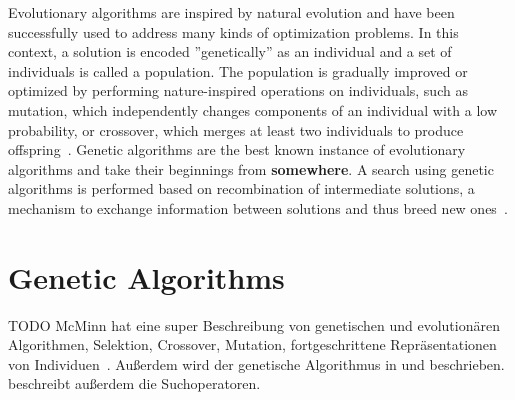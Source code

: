 \documentclass[paper=a4,%
  twoside,%
  BCOR4mm,%
  abstract=true,%
  toc=bibliography,%
  chapterprefix=true,%
  toc=bibliographynumbered,%
  open=right,%
  english,%
  pagesize=pdftex]{scrreprt}
\begin{document}
Evolutionary algorithms are inspired by natural evolution and have been successfully used to address many kinds of optimization problems. In this context, a solution is encoded ''genetically'' as an individual and a set of individuals is called a population. The population is gradually improved or optimized by performing nature-inspired operations on individuals, such as mutation, which independently changes components of an individual with a low probability, or crossover, which merges at least two individuals to produce offspring~\cite{Campos2017a}. Genetic algorithms are the best known instance of evolutionary algorithms and take their beginnings from \textbf{somewhere}. A search using genetic algorithms is performed based on recombination of intermediate solutions, a mechanism to exchange information between solutions and thus breed new ones~\cite{McMinn_2004}.

\section{Genetic Algorithms}
TODO McMinn hat eine super Beschreibung von genetischen und evolutionären Algorithmen, Selektion, Crossover, Mutation, fortgeschrittene Repräsentationen von Individuen~\cite{McMinn_2004}. Außerdem wird der genetische Algorithmus in \cite{Fraser2011} und \cite{Fraser_2013} beschrieben. \cite{Fraser_2013} beschreibt außerdem die Suchoperatoren.

\end{document}
